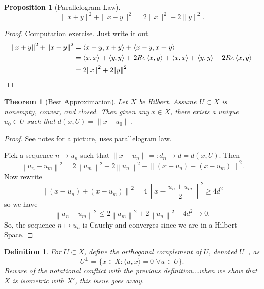 \documentclass[letterpaper,twoside,11pt]{article}
\theoremstyle{mystyle}
\newtheorem*{thm}{Theorem}		%
\newtheorem{definition}{Definition}[section]
\newtheorem*{propp}{Proposition}
\begin{document}
\begin{propp}[Parallelogram Law]
  \[\|x+y\|^2 + \|x-y\|^2 = 2\|x\|^2 + 2\|y\|^2 .\]
\end{propp}
\begin{proof}
  Computation exercise. Just write it out. 
  \begin{align*}
    {\left\| {x + y} \right\|^2} + {\left\| {x - y} \right\|^2} &= \left\langle {x + y,x + y} \right\rangle  + \left\langle {x - y,x - y} \right\rangle  \hfill \\
     &= \left\langle {x,x} \right\rangle  + \left\langle {y,y} \right\rangle  + 2Re\left\langle {x,y} \right\rangle  + \left\langle {x,x} \right\rangle  + \left\langle {y,y} \right\rangle  - 2Re\left\langle {x,y} \right\rangle  \hfill \\
     &= 2{\left\| x \right\|^2} + 2{\left\| y \right\|^2} 
  \end{align*}
\end{proof}
\begin{thm}[Best Approximation]
  Let $X$ be Hilbert. Assume $U \subset X$ is nonempty, convex, and closed. Then given any $x\in X$, there exists a unique $u_0 \in U$ such that $d(x,U) = \|x-u_0\|$. 
\end{thm}
\begin{proof}
  See notes for a picture, uses parallelogram law. 

  Pick a sequence $n\mapsto u_n$ such that $\|x-u_n\|=:d_n \to d = d(x,U)$. Then 
  \[{\left\| {{u_n} - {u_m}} \right\|^2} = 2{\left\| {{u_m}} \right\|^2} + 2{\left\| {{u_n}} \right\|^2} - {\left\| {\left( {x - {u_n}} \right) + \left( {x - {u_m}} \right)} \right\|^2}.\]
Now rewrite \[{\left\| {\left( {x - {u_n}} \right) + \left( {x - {u_m}} \right)} \right\|^2} = 4{\left\| {x - \frac{{{u_n} + {u_m}}}{2}} \right\|^2} \geq 4{d^2}\]
so we have
\[{\left\| {{u_n} - {u_m}} \right\|^2} \leq 2{\left\| {{u_m}} \right\|^2} + 2{\left\| {{u_n}} \right\|^2} - 4{d^2} \to 0.\]
So, the sequence $n\mapsto u_n$ is Cauchy and converges since we are in a Hilbert Space. 
\end{proof}
\begin{definition}
  For $U \subset X$, define the \underline{orthogonal complement} of $U$, denoted $U^\perp$, as 
  \[U^\perp = \{x\in X : \langle u,x\rangle=0 \,\, \forall u \in U \}.\] Beware of the notational conflict with the previous definition...when we show that $X$ is isometric with $X'$, this issue goes away. 
\end{definition}
\end{document}
